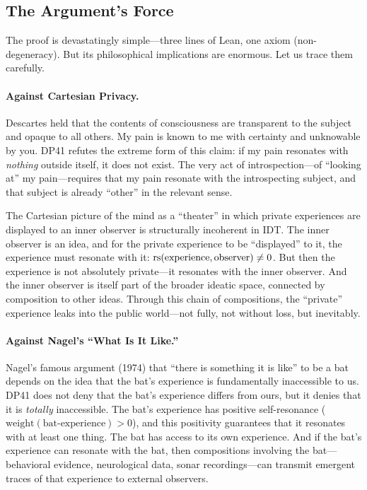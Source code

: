 \subsection{The Argument's Force}

The proof is devastatingly simple---three lines of Lean, one axiom
(non-degeneracy).  But its philosophical implications are enormous.  Let us
trace them carefully.

\paragraph{Against Cartesian Privacy.}
Descartes held that the contents of consciousness are transparent to the
subject and opaque to all others.  My pain is known to me with certainty
and unknowable by you.  DP41 refutes the extreme form of this claim: if my
pain resonates with \emph{nothing} outside itself, it does not exist.  The
very act of introspection---of ``looking at'' my pain---requires that my pain
resonate with the introspecting subject, and that subject is already ``other''
in the relevant sense.

The Cartesian picture of the mind as a ``theater'' in which private experiences
are displayed to an inner observer is structurally incoherent in IDT.  The
inner observer is an idea, and for the private experience to be ``displayed''
to it, the experience must resonate with it: $\mathrm{rs}(\mathrm{experience},
\mathrm{observer}) \neq 0$.  But then the experience is not absolutely
private---it resonates with the inner observer.  And the inner observer is
itself part of the broader ideatic space, connected by composition to other
ideas.  Through this chain of compositions, the ``private'' experience leaks
into the public world---not fully, not without loss, but inevitably.

\paragraph{Against Nagel's ``What Is It Like.''}
Nagel's famous argument (1974) that ``there is something it is like'' to be a
bat depends on the idea that the bat's experience is fundamentally inaccessible
to us.  DP41 does not deny that the bat's experience differs from ours, but it
denies that it is \emph{totally} inaccessible.  The bat's experience has
positive self-resonance ($\mathrm{weight}(\mathrm{bat\text{-}experience}) > 0$),
and this positivity guarantees that it resonates with at least one thing.  The
bat has access to its own experience.  And if the bat's experience can resonate
with the bat, then compositions involving the bat---behavioral evidence,
neurological data, sonar recordings---can transmit emergent traces of that
experience to external observers.


